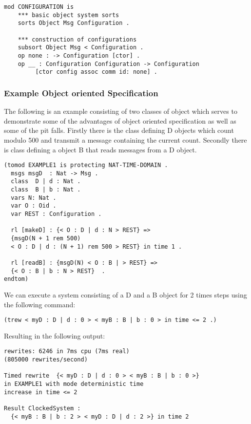 \begin{lstlisting}[caption = The Maude Configuration module]
mod CONFIGURATION is  
    *** basic object system sorts  
    sorts Object Msg Configuration .  
 
    *** construction of configurations  
    subsort Object Msg < Configuration .  
    op none : -> Configuration [ctor] .  
    op __ : Configuration Configuration -> Configuration  
         [ctor config assoc comm id: none] .
\end{lstlisting}

\subsubsection*{Example Object oriented Specification}
The following is an example consisting of two classes of object which serves to demonstrate some of the advantages of object oriented specification as well as some of the pit falls. Firstly there is the class defining D objects which count modulo 500 and transmit a message containing the current count. Secondly there is class defining a object B that reads messages from a D object. 

\begin{lstlisting}[caption = Example object oriented specification, label = code:rtmaudeexample]
(tomod EXAMPLE1 is protecting NAT-TIME-DOMAIN .
  msgs msgD  : Nat -> Msg .  
  class  D | d : Nat .
  class  B | b : Nat .
  vars N: Nat .
  var O : Oid .
  var REST : Configuration .
 
  rl [makeD] : {< O : D | d : N > REST} => 
  {msgD(N + 1 rem 500)  
  < O : D | d : (N + 1) rem 500 > REST} in time 1 . 

  rl [readB] : {msgD(N) < O : B | > REST} => 
  {< O : B | b : N > REST}  . 
endtom)
\end{lstlisting}

We can execute a system consisting of a D  and a B object for 2 times steps using the following command:
\begin{center}
\texttt{(trew {< myD : D | d : 0 > < myB : B | b : 0 >} in time <= 2 .)}
\end{center}

Resulting in the following output:
\medskip
\begin{lstlisting}
rewrites: 6246 in 7ms cpu (7ms real) 
(805000 rewrites/second)

Timed rewrite  {< myD : D | d : 0 > < myB : B | b : 0 >} 
in EXAMPLE1 with mode deterministic time 
increase in time <= 2

Result ClockedSystem :
  {< myB : B | b : 2 > < myD : D | d : 2 >} in time 2
\end{lstlisting}

